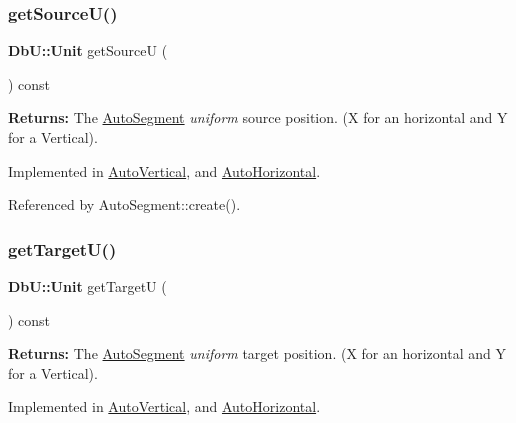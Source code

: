 \mbox{\label{classKatabatic_1_1AutoSegment_aeaa1543880686755e389c4807128428f}} 
\subsubsection{\texorpdfstring{get\+Source\+U()}{getSourceU()}}
{\footnotesize\ttfamily \textbf{ Db\+U\+::\+Unit} get\+SourceU (\begin{DoxyParamCaption}{ }\end{DoxyParamCaption}) const\hspace{0.3cm}{\ttfamily [pure virtual]}}

{\bfseries Returns\+:} The \hyperlink{classKatabatic_1_1AutoSegment}{Auto\+Segment} {\itshape uniform} source position. (X for an horizontal and Y for a Vertical). 

Implemented in \hyperlink{classKatabatic_1_1AutoVertical_ad521ffba761b0e81b7b81b99d62f76f9}{Auto\+Vertical}, and \hyperlink{classKatabatic_1_1AutoHorizontal_ad521ffba761b0e81b7b81b99d62f76f9}{Auto\+Horizontal}.



Referenced by Auto\+Segment\+::create().

\mbox{\label{classKatabatic_1_1AutoSegment_a828fef2716cc9c370d6d170bb96556ec}} 
\subsubsection{\texorpdfstring{get\+Target\+U()}{getTargetU()}}
{\footnotesize\ttfamily \textbf{ Db\+U\+::\+Unit} get\+TargetU (\begin{DoxyParamCaption}{ }\end{DoxyParamCaption}) const\hspace{0.3cm}{\ttfamily [pure virtual]}}

{\bfseries Returns\+:} The \hyperlink{classKatabatic_1_1AutoSegment}{Auto\+Segment} {\itshape uniform} target position. (X for an horizontal and Y for a Vertical). 

Implemented in \hyperlink{classKatabatic_1_1AutoVertical_a4d52a506cd19dfa8e22e1dc0695bd960}{Auto\+Vertical}, and \hyperlink{classKatabatic_1_1AutoHorizontal_a4d52a506cd19dfa8e22e1dc0695bd960}{Auto\+Horizontal}.



